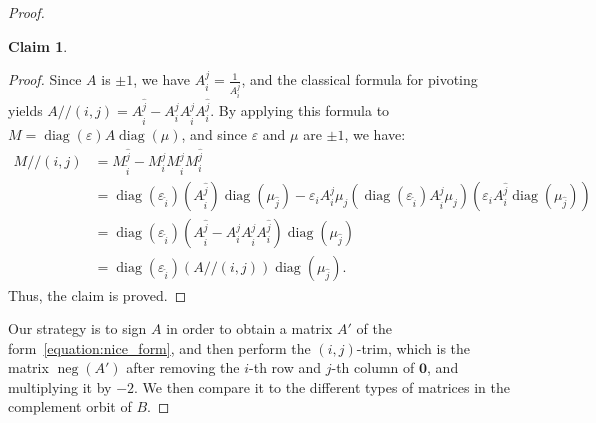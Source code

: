 \documentclass[11pt,a4paper]{amsart}
\theoremstyle{plain}
\newtheorem{claim}[theorem]{Claim}
\theoremstyle{definition}
\newcommand{\trim}{/\!\!/}
\DeclareMathOperator{\diag}{diag}
\DeclareMathOperator{\nega}{neg}
\begin{document}
\begin{proof}
\begin{claim}
\end{claim}
\begin{proof}
Since $A$ is $\pm1$, we have $A_i^j =\frac{1}{A_i^j}$, and the classical formula for pivoting yields 
$A\trim (i,j) = A_{\widehat{i}}^{\widehat{j}} - A_i^j A_{\widehat{i}}^{j} A_{i}^{\widehat{j}}$.
By applying this formula to $M=\diag(\varepsilon)A\diag(\mu)$, and since $\varepsilon$ and $\mu$ are $\pm1$, we have:
\begin{align*}
	M\trim (i,j) &= M_{\widehat{i}}^{\widehat{j}} - M_i^j M_{\widehat{i}}^{j} M_{i}^{\widehat{j}} \\ &= \diag(\varepsilon_{\widehat{i}})(A_{\widehat{i}}^{\widehat{j}})\diag(\mu_{\widehat{j}}) - \varepsilon_iA_i^j\mu_j (\diag(\varepsilon_{\widehat{i}})A_{\widehat{i}}^{j} \mu_j)(\varepsilon_i A_{i}^{\widehat{j}}\diag(\mu_{\widehat{j}}))\\
	&=\diag(\varepsilon_{\widehat{i}})\left(A_{\widehat{i}}^{\widehat{j}} - A_i^j A_{\widehat{i}}^{j} A_{i}^{\widehat{j}}\right)\diag(\mu_{\widehat{j}})\\
	&= \diag(\varepsilon_{\widehat{i}})(A\trim(i,j))\diag(\mu_{\widehat{j}}).
\end{align*}
Thus, the claim is proved.
\end{proof}
Our strategy is to sign $A$ in order to obtain a matrix $A'$ of the form~\eqref{equation:nice_form}, and then perform the $(i,j)$-trim, which is the matrix $\nega{(A')}$ after removing the $i$-th row and $j$-th column of $\mathbf{0}$, and multiplying it by $-2$.
We then compare it to the different types of matrices in the complement orbit of $B$.

\end{proof}
\end{document}
